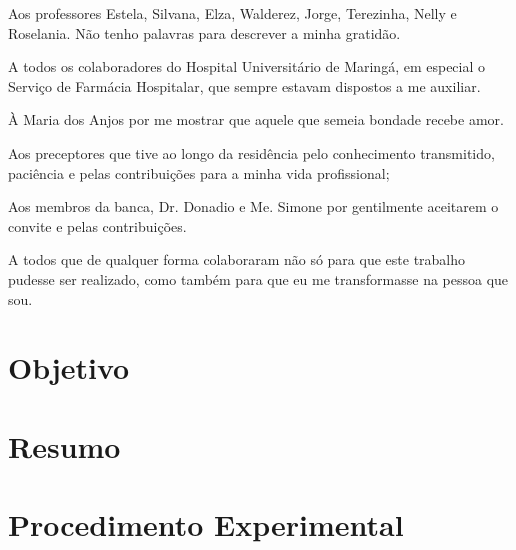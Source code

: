 \documentclass[
	12pt,				%
	oneside,			%
	a4paper,			%
	english,			%
	french,				%
	spanish,			%
	brazil,				%
	]{abntex2}
\begin{document}
Aos professores Estela, Silvana, Elza, Walderez, Jorge, Terezinha, Nelly e Roselania. Não tenho palavras para descrever a minha gratidão. 

A todos os colaboradores do Hospital Universitário de Maringá, em especial o Serviço de Farmácia Hospitalar, que sempre estavam dispostos a me auxiliar. 

À Maria dos Anjos por me mostrar que aquele que semeia bondade recebe amor. 

Aos preceptores que tive ao longo da residência pelo conhecimento transmitido, paciência e pelas contribuições para a minha vida profissional; 

Aos membros da banca, Dr. Donadio e Me. Simone por gentilmente aceitarem o convite e pelas contribuições. 

A todos que de qualquer forma colaboraram não só para que este trabalho pudesse ser realizado, como também para que eu me transformasse na pessoa que sou.


\section[Objetivo]{Objetivo}
\pagestyle{fancy}



\newpage
\section[Resumo]{Resumo}




\newpage
\section[Procedimento Experimental]{Procedimento Experimental}






\end{document}
